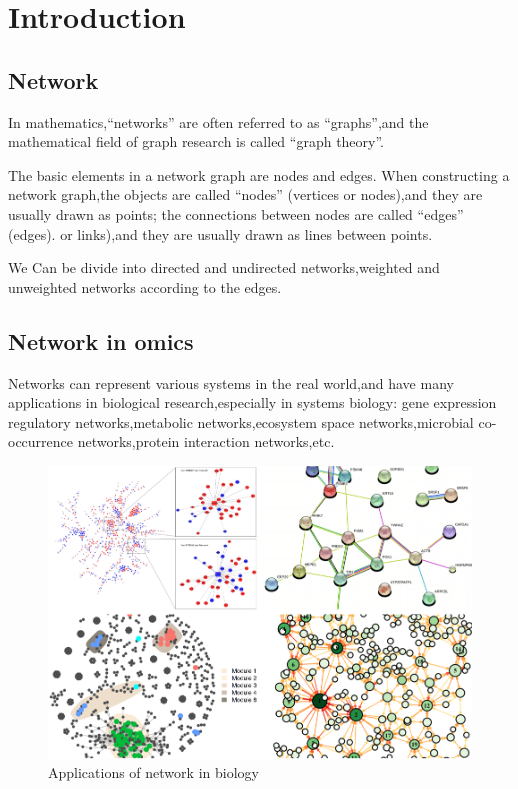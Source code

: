 \documentclass[
]{book}
\begin{document}
\hypertarget{introduction}{%
\chapter{Introduction}\label{introduction}}

\hypertarget{network}{%
\section{Network}\label{network}}

In mathematics,``networks'' are often referred to as ``graphs'',and the
mathematical field of graph research is called ``graph theory''.

The basic elements in a network graph are nodes and edges. When
constructing a network graph,the objects are called ``nodes'' (vertices or
nodes),and they are usually drawn as points; the connections between
nodes are called ``edges'' (edges). or links),and they are usually drawn
as lines between points.

We Can be divide into directed and undirected networks,weighted and
unweighted networks according to the edges.

\hypertarget{network-in-omics}{%
\section{Network in omics}\label{network-in-omics}}

Networks can represent various systems in the real world,and have many
applications in biological research,especially in systems biology: gene
expression regulatory networks,metabolic networks,ecosystem space
networks,microbial co-occurrence networks,protein interaction
networks,etc.

\begin{figure}
\includegraphics[width=13.15in]{images/1-1.net_application} \caption{Applications of network in biology}\label{fig:unnamed-chunk-4}
\end{figure}
\end{document}

